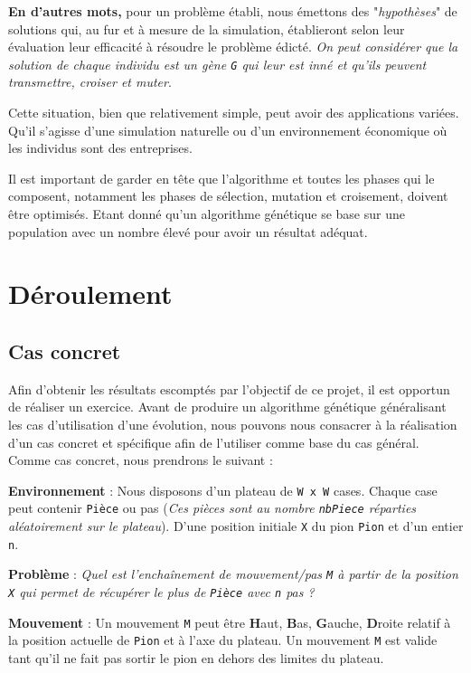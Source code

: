 \textbf{En d'autres mots,} pour un problème établi, nous émettons des
"\emph{hypothèses}" de solutions qui, au fur et à mesure de la
simulation, établieront selon leur évaluation leur efficacité à résoudre
le problème édicté. \emph{On peut considérer que la solution de chaque
individu est un gène \texttt{G} qui leur est inné et qu'ils peuvent
transmettre, croiser et muter}.

Cette situation, bien que relativement simple, peut avoir des
applications variées. Qu'il s'agisse d'une simulation naturelle ou d'un
environnement économique où les individus sont des entreprises.

Il est important de garder en tête que l'algorithme et toutes les phases
qui le composent, notamment les phases de sélection, mutation et
croisement, doivent être optimisés. Etant donné qu'un algorithme
génétique se base sur une population avec un nombre élevé pour avoir un
résultat adéquat.

\hypertarget{duxe9roulement}{%
\section{Déroulement}\label{duxe9roulement}}

\hypertarget{cas-concret}{%
\subsection{Cas concret}\label{cas-concret}}

Afin d'obtenir les résultats escomptés par l'objectif de ce projet, il
est opportun de réaliser un exercice. Avant de produire un algorithme
génétique généralisant les cas d'utilisation d'une évolution, nous
pouvons nous consacrer à la réalisation d'un cas concret et spécifique
afin de l'utiliser comme base du cas général. Comme cas concret, nous
prendrons le suivant :

\textbf{Environnement} : Nous disposons d'un plateau de \texttt{W\ x\ W}
cases. Chaque case peut contenir \texttt{Pièce} ou pas (\emph{Ces pièces
sont au nombre \texttt{nbPiece} réparties aléatoirement sur le
plateau}). D'une position initiale \texttt{X} du pion \texttt{Pion} et
d'un entier \texttt{n}.

\textbf{Problème} : \emph{Quel est l'enchaînement de mouvement/pas
\texttt{M} à partir de la position \texttt{X} qui permet de récupérer le
plus de \texttt{Pièce} avec \texttt{n} pas ?}

\textbf{Mouvement} : Un mouvement \texttt{M} peut être \textbf{H}aut,
\textbf{B}as, \textbf{G}auche, \textbf{D}roite relatif à la position
actuelle de \texttt{Pion} et à l'axe du plateau. Un mouvement \texttt{M}
est valide tant qu'il ne fait pas sortir le pion en dehors des limites
du plateau.

